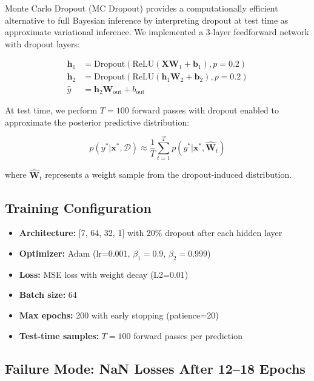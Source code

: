 Monte Carlo Dropout (MC Dropout) provides a computationally efficient alternative to full Bayesian inference by interpreting dropout at test time as approximate variational inference. We implemented a 3-layer feedforward network with dropout layers:

\begin{align}
\mathbf{h}_1 &= \text{Dropout}(\text{ReLU}(\mathbf{X} \mathbf{W}_1 + \mathbf{b}_1), p=0.2) \\
\mathbf{h}_2 &= \text{Dropout}(\text{ReLU}(\mathbf{h}_1 \mathbf{W}_2 + \mathbf{b}_2), p=0.2) \\
\hat{y} &= \mathbf{h}_2 \mathbf{W}_{\text{out}} + b_{\text{out}}
\end{align}

At test time, we perform $T=100$ forward passes with dropout enabled to approximate the posterior predictive distribution:

\begin{equation}
p(y^* | \mathbf{x}^*, \mathcal{D}) \approx \frac{1}{T} \sum_{t=1}^{T} p(y^* | \mathbf{x}^*, \hat{\mathbf{W}}_t)
\end{equation}

where $\hat{\mathbf{W}}_t$ represents a weight sample from the dropout-induced distribution.

\subsection{Training Configuration}

\begin{itemize}
  \item \textbf{Architecture:} [7, 64, 32, 1] with 20\% dropout after each hidden layer
  \item \textbf{Optimizer:} Adam (lr=0.001, $\beta_1=0.9$, $\beta_2=0.999$)
  \item \textbf{Loss:} MSE loss with weight decay (L2=0.01)
  \item \textbf{Batch size:} 64
  \item \textbf{Max epochs:} 200 with early stopping (patience=20)
  \item \textbf{Test-time samples:} $T=100$ forward passes per prediction
\end{itemize}

\subsection{Failure Mode: NaN Losses After 12--18 Epochs}

